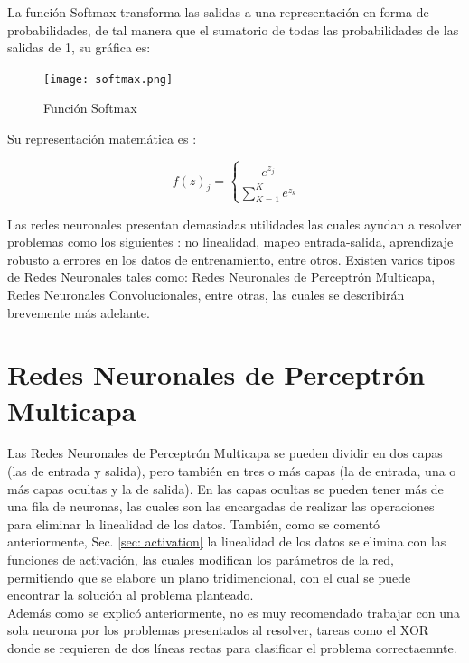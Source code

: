                 La función Softmax transforma las salidas a una representación en forma de 
                probabilidades, de tal manera que el sumatorio de todas las probabilidades 
                de las salidas de 1, su gr\'afica es: \label{subsec: softmax}

                \begin{figure}[H]
                    \centering
                    \texttt{[image: softmax.png]}
                    \caption{Funci\'on Softmax}
                    \label{fig:fig7}
                \end{figure}

                Su representaci\'on matem\'atica es \cite{calvo-2018}:

                \[f(z)_j = \left\{ \frac{e^{z_j}}{\sum_{K=1}^{K} e^{z_k}} \right. \]

        Las redes neuronales presentan demasiadas utilidades las cuales ayudan a resolver problemas como los 
        siguientes \cite{liu2015}: no linealidad, mapeo entrada-salida, aprendizaje robusto 
        a errores en los datos de entrenamiento, entre otros.  Existen varios tipos de Redes Neuronales tales como: Redes Neuronales de Perceptr\'on 
        Multicapa, Redes Neuronales Convolucionales, entre otras, las cuales se describirán brevemente más adelante.
    
        \section{Redes Neuronales de Perceptr\'on Multicapa}
        
            Las Redes Neuronales de Perceptr\'on Multicapa se pueden dividir en dos capas (las de entrada y salida), pero también en tres o más capas (la de entrada, una o más capas ocultas y la de salida).  En las capas ocultas se pueden 
            tener m\'as de una fila de neuronas, las cuales son las encargadas de realizar las operaciones para eliminar 
            la linealidad de los datos.  También, como se comentó anteriormente,  Sec. \eqref{sec: activation} la linealidad de los datos se elimina 
            con las funciones de activaci\'on,  las cuales modifican los parámetros de la red,  permitiendo que se elabore un plano tridimencional,  
            con el cual se puede encontrar la soluci\'on al problema planteado.\\
            Adem\'as como se explicó anteriormente, no es muy recomendado trabajar con una sola 
            neurona por los problemas presentados al resolver, tareas como el XOR donde se requieren de dos líneas rectas para clasificar el problema correctaemnte.

